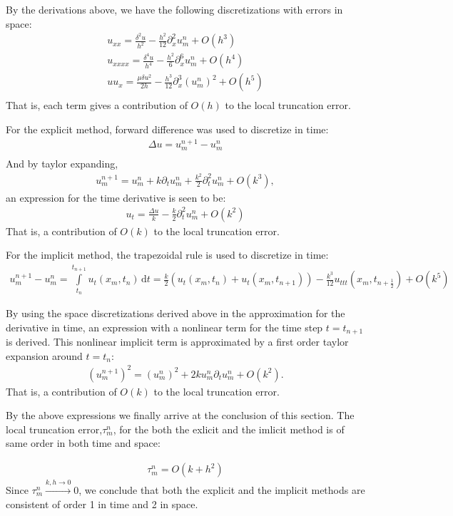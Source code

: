 By the derivations above, we have the following discretizations with errors in space:
\begin{align*}
u_{xx} = \frac{\delta^2 u}{h^2} - \frac{h^2}{12}\partial_{x}^2u_m^n + O(h^3) \\
u_{xxxx} = \frac{\delta^4 u}{h^4} - \frac{h^2}{6}\partial_{x}^6u_m^n + O(h^4) \\
uu_{x} = \frac{\mu \delta u^2}{2h} - \frac{h^3}{12}\partial_{x}^3(u_m^n)^2 + O(h^5) \\
\end{align*}
That is, each term gives a contribution of $O(h)$ to the local truncation error.

For the explicit method, forward difference was used to discretize in time:
\begin{align*}
\Delta u = u_m^{n+1}-u_m^n \\
\end{align*}
And by taylor expanding,
\begin{align*}
u_m^{n+1} = u_m^n + k\partial_tu_m^n + \frac{k^2}{2}\partial_t^2u_m^n + O(k^3),
\end{align*}
an expression for the time derivative is seen to be:
\begin{align*}
u_t = \frac{\Delta u}{k} - \frac{k}{2}\partial_t^2u_m^n + O(k^2)
\end{align*}
That is, a contribution of $O(k)$ to the local truncation error.

For the implicit method, the trapezoidal rule is used to discretize in time:
\begin{align*}
u_{m}^{n+1} - u_m^n = \int\limits_{t_{n}}^{t_{n+1}} u_{t}(x_{m},t_{n})\, \mathrm{d}t = \frac{k}{2}(u_t(x_m,t_n) + u_t(x_m,t_{n+1})) - \frac{k^3}{12}u_{ttt}(x_m,t_{n+\frac{1}{2}}) + O(k^5)
\end{align*}

By using the space discretizations derived above in the approximation for the derivative in time, an expression with a nonlinear term for the time step $t=t_{n+1}$ is derived. This nonlinear implicit term is approximated by a first order taylor expansion around $t=t_{n}$:
\begin{align*}
(u_m^{n+1})^2 = (u_m^n)^2 + 2ku_m^n\partial_tu_m^n + O(k^2).
\end{align*}
That is, a contribution of $O(k)$ to the local truncation error.

By the above expressions we finally arrive at the conclusion of this section. The local truncation error,$\tau_m^n$, for the both the exlicit and the imlicit method is of same order in both time and space:

\begin{align*}
\tau_m^n = O(k + h^2)
\end{align*}
Since $\tau_m^n \xrightarrow{k,h \to 0} 0$, we conclude that both the explicit and the implicit methods are consistent of order 1 in time and 2 in space.

